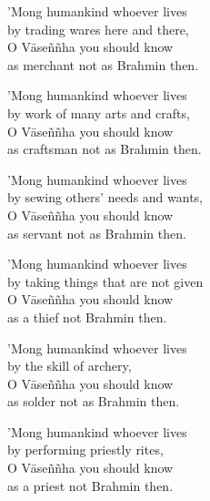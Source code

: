 \begin{MyDescription}{}
'Mong humankind whoever lives\\
by trading wares here and there,\\
O V\=ase\~n\~nha you should know\\
as merchant not as Brahmin then.

\end{MyDescription}

\begin{MyDescription}{}
'Mong humankind whoever lives\\
by work of many arts and crafts,\\
O V\=ase\~n\~nha you should know\\
as craftsman not as Brahmin then.
\end{MyDescription}

\begin{MyDescription}{}
'Mong humankind whoever lives\\
by sewing others' needs and wants,\\
O V\=ase\~n\~nha you should know\\
as servant not as Brahmin then.
\end{MyDescription}

\begin{MyDescription}{}
'Mong humankind whoever lives\\
 by taking things that are not given\\
 O V\=ase\~n\~nha you should know\\
 as a thief not Brahmin then.
\end{MyDescription}

\begin{MyDescription}{}
'Mong humankind whoever lives\\
by the skill of archery,\\
O V\=ase\~n\~nha you should know\\
as solder not as Brahmin then.
\end{MyDescription}

\begin{MyDescription}{}
'Mong humankind whoever lives\\
by performing priestly rites,\\
O V\=ase\~n\~nha you should know\\
as a priest not Brahmin then.
\end{MyDescription}


